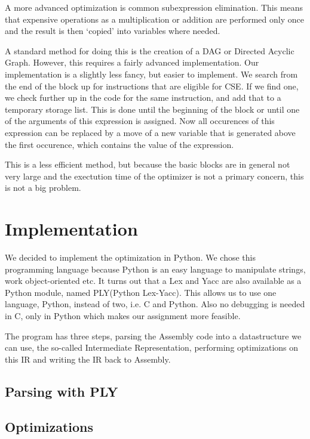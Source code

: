 \documentclass[10pt,a4paper]{article}
\begin{document}
A more advanced optimization is common subexpression elimination. This means
that expensive operations as a multiplication or addition are performed only
once and the result is then `copied' into variables where needed.

A standard method for doing this is the creation of a DAG or Directed Acyclic
Graph. However, this requires a fairly advanced implementation. Our
implementation is a slightly less fancy, but easier to implement.
We search from the end of the block up for instructions that are eligible for
CSE. If we find one, we check further up in the code for the same instruction,
and add that to a temporary storage list. This is done until the beginning of
the block or until one of the arguments of this expression is assigned. Now all
occurences of this expression can be replaced by a move of a new variable that
is generated above the first occurence, which contains the value of the
expression.

This is a less efficient method, but because the basic blocks are in general
not very large and the exectution time of the optimizer is not a primary
concern, this is not a big problem.

\section{Implementation}

We decided to implement the optimization in Python. We chose this programming
language because Python is an easy language to manipulate strings, work
object-oriented etc.
It turns out that a Lex and Yacc are also available as a Python module,
named PLY(Python Lex-Yacc). This allows us to use one language, Python, instead
of two, i.e. C and Python. Also no debugging is needed in C, only in Python
which makes our assignment more feasible.

The program has three steps, parsing the Assembly code into a datastructure we
can use, the so-called Intermediate Representation, performing optimizations on
this IR and writing the IR back to Assembly.

\subsection{Parsing with PLY}



\subsection{Optimizations}
\end{document}
